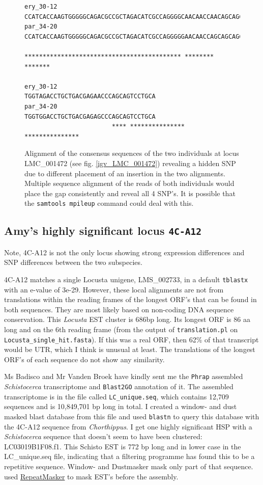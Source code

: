 \documentclass{article}\usepackage[]{graphicx}\usepackage[]{color}
\begin{document}
\begin{figure}
\centering
\begin{Verbatim}
ery_30-12               CCATCACCAAGTGGGGGCAGACGCCGCTAGACATCGCCAGGGGCAACAACCAACAGCAGC
par_34-20               CCATCACCAAGTGGGGGCAGACGCCGCTAGACATCGCCAGGGGGAACAACCAGCAGCAGC
                        ******************************************* ******** *******

ery_30-12               TGGTAGACCTGCTGACGAGAACCCAGCAGTCCTGCA
par_34-20               TGGTGGACCTGCTGACGAGAGCCCAGCAGTCCTGCA
                        **** *************** ***************
\end{Verbatim}
\caption{Alignment of the consensus sequences of the two individuals at locus LMC\_001472 (see fig. \ref{igv_LMC_001472}) revealing a hidden SNP due to different placement of an insertion in the two alignments. Multiple sequence alignment of the reads of both individuals would place the gap consistently and reveal all 4 SNP's. It is possible that the \texttt{samtools mpileup} command could deal with this.}
\label{muscle_LMC_001472}
\end{figure}

\subsection{Amy's highly significant locus \texttt{4C-A12}}
\label{4C-A12}
Note, 4C-A12 is not the only locus showing strong expression differences and SNP differences between the two subspecies.

4C-A12 matches a single Locusta unigene, LMS\_002733, in a default \texttt{tblastx} with an e-value of 3e-29. However, these local alignments are not from translations within the reading frames of the longest ORF's that can be found in both sequences. They are most likely based on non-coding DNA sequence conservation. This \textit{Locusta} EST cluster is 686bp long. Its longest ORF is 86 aa long and on the 6th reading frame (from the output of \texttt{translation.pl} on  \texttt{Locusta\_single\_hit.fasta}). If this was a real ORF, then 62\% of that transcript would be UTR, which I think is unusual at least. The translations of the longest ORF's of each sequence do not show any similarity.

Ms Badisco and Mr Vanden Broek have kindly sent me the \texttt{Phrap} assembled \textit{Schistocerca} transcriptome and \texttt{Blast2GO} annotation of it. The assembled transcriptome is in the file called \texttt{LC\_unique.seq}, which contains 12,709 sequences and is 10,849,701 bp long in total. I created a window- and dust masked blast database from this file and used \texttt{blastn} to query this database with the 4C-A12 sequence from \textit{Chorthippus}. I get one highly significant HSP with a \textit{Schistocerca} sequence that doesn't seem to have been clustered: LC03019B1F08.f1. This Schisto EST is 772 bp long and in lower case in the LC\_unique.seq file, indicating that a filtering programme has found this to be a repetitive sequence. Window- and Dustmasker mask only part of that sequence. \cite{Badisco2011} used \href{http://www.repeatmasker.org/}{RepeatMasker} to mask EST's before the assembly.
\end{document}
